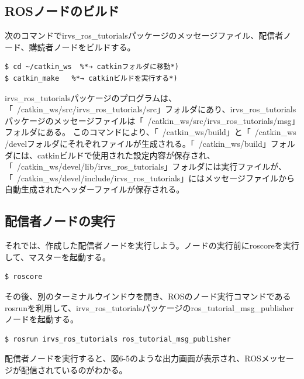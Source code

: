 \subsection{ROSノードのビルド}

次のコマンドでirvs\_ros\_tutorialsパッケージのメッセージファイル、配信者ノード、購読者ノードをビルドする。

\begin{lstlisting}[language=ROS]
$ cd ~/catkin_ws  %*→ catkinフォルダに移動*)
$ catkin_make   %*→ catkinビルドを実行する*)
\end{lstlisting}

irvs\_ros\_tutorialsパッケージのプログラムは、「~/catkin\_ws/src/irvs\_ros\_tutorials/src」フォルダにあり、irvs\_ros\_tutorialsパッケージのメッセージファイルは「~/catkin\_ws/src/irvs\_ros\_tutorials/msg」フォルダにある。
このコマンドにより、「~/catkin\_ws/build」と「~/catkin\_ws /develフォルダにそれぞれファイルが生成される。「~/catkin\_ws/build」フォルダには、catkinビルドで使用された設定内容が保存され、「~/catkin\_ws/devel/lib/irvs\_ros\_tutorials」フォルダには実行ファイルが、「~/catkin\_ws/devel/include/irvs\_ros\_tutorials」にはメッセージファイルから自動生成されたヘッダーファイルが保存される。

\subsection{配信者ノードの実行}

それでは、作成した配信者ノードを実行しよう。ノードの実行前にroscoreを実行して、マスターを起動する。

\begin{lstlisting}[language=ROS]
$ roscore
\end{lstlisting}

その後、別のターミナルウインドウを開き、ROSのノード実行コマンドであるrosrunを利用して、irvs\_ros\_tutorialsパッケージのros\_tutorial\_msg\_publisherノードを起動する。

\begin{lstlisting}[language=ROS]
$ rosrun irvs_ros_tutorials ros_tutorial_msg_publisher
\end{lstlisting}

配信者ノードを実行すると、図6-5のような出力画面が表示され、ROSメッセージが配信されているのがわかる。

